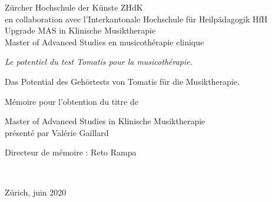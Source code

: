 
\begin{titlepage}
 \begin{center}
    \Large
     Zürcher Hochschule der Künste ZHdK\\
 	en collaboration avec l'Interkantonale Hochschule für
        Heilpädagogik HfH \\
	 Upgrade MAS in Klinische Musiktherapie \\ Master of Advanced Studies en musicothérapie clinique\\
  \vfill
  { \LARGE
\emph{Le potentiel du test Tomatis pour la musicothérapie.}\\ \bigskip


Das Potential des Gehörtests von Tomatis für die Musiktherapie.}
 \vfill

Mémoire pour l'obtention du titre de

Master of Advanced Studies in Klinische Musiktherapie \\ présenté par Valérie Gaillard

{\large Directeur de mémoire : Reto Rampa}



	 \hfill \\
	 \rule{0mm}{1pt} \hfill
{\large Zürich, juin 2020}
 \end{center}
\end{titlepage}
